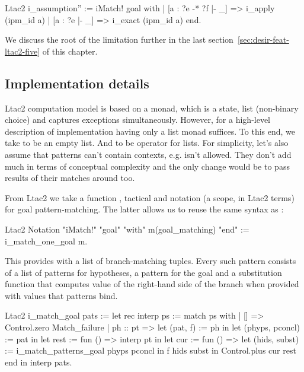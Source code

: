 \begin{itemize}
\begin{minipage}{\linewidth}
\begin{coq}
Ltac2 i_assumption'' :=
  iMatch! goal with
  | [a : ?e -* ?f |- _] => i_apply (ipm_id a)
  | [a : ?e |- _] => i_exact (ipm_id a)
  end.
\end{coq}
\end{minipage}

We discuss the root of the limitation further in the last section~\ref{sec:desir-feat-ltac2-five} of this chapter.
\end{itemize}

\subsection{Implementation details}
\label{subsec:implementation_details}

Ltac2 computation model is based on a monad, which is a state, list (non-binary choice) and captures exceptions simultaneously.
However, for a high-level description of implementation having only a list monad  suffices.
To this end, we take  to be an empty list.
And  to be  operator for lists.
For simplicity, let's also assume that patterns can't contain contexts, e.g.  isn't allowed.
They don't add much in terms of conceptual complexity and the only change would be to pass results of their matches around too.

From Ltac2 we take a function ,  tactical and notation (a scope, in Ltac2 terms) for goal pattern-matching.
The latter allows us to reuse the same syntax as :
\begin{coq}
Ltac2 Notation "iMatch!" "goal" "with" m(goal_matching) "end" :=
  i_match_one_goal m.
\end{coq}
This provides  with a list of branch-matching tuples.
Every such pattern consists of a list of patterns for hypotheses, a pattern for the goal and a substitution function that computes value of the right-hand side of the branch when provided with values that patterns bind.

\begin{coq}
Ltac2 i_match_goal pats :=
  let rec interp ps := match ps with
  | [] => Control.zero Match_failure
  | ph :: pt =>
    let (pat, f) := ph in
    let (phyps, pconcl) := pat in
    let rest := fun () => interp pt in
    let cur := fun () =>
      let (hids, subst) := i_match_patterns_goal phyps pconcl in
      f hids subst
    in Control.plus cur rest
  end in
  interp pats.
\end{coq}

